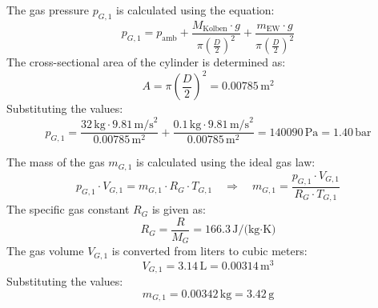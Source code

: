 The gas pressure \( p_{G,1} \) is calculated using the equation:  
\[
p_{G,1} = p_{\text{amb}} + \frac{M_{\text{Kolben}} \cdot g}{\pi \left(\frac{D}{2}\right)^2} + \frac{m_{\text{EW}} \cdot g}{\pi \left(\frac{D}{2}\right)^2}
\]  
The cross-sectional area of the cylinder is determined as:  
\[
A = \pi \left(\frac{D}{2}\right)^2 = 0.00785 \, \text{m}^2
\]  
Substituting the values:  
\[
p_{G,1} = \frac{32 \, \text{kg} \cdot 9.81 \, \text{m/s}^2}{0.00785 \, \text{m}^2} + \frac{0.1 \, \text{kg} \cdot 9.81 \, \text{m/s}^2}{0.00785 \, \text{m}^2} = 140090 \, \text{Pa} = 1.40 \, \text{bar}
\]  

The mass of the gas \( m_{G,1} \) is calculated using the ideal gas law:  
\[
p_{G,1} \cdot V_{G,1} = m_{G,1} \cdot R_G \cdot T_{G,1} \quad \Rightarrow \quad m_{G,1} = \frac{p_{G,1} \cdot V_{G,1}}{R_G \cdot T_{G,1}}
\]  
The specific gas constant \( R_G \) is given as:  
\[
R_G = \frac{R}{M_G} = 166.3 \, \text{J/(kg·K)}
\]  
The gas volume \( V_{G,1} \) is converted from liters to cubic meters:  
\[
V_{G,1} = 3.14 \, \text{L} = 0.00314 \, \text{m}^3
\]  
Substituting the values:  
\[
m_{G,1} = 0.00342 \, \text{kg} = 3.42 \, \text{g}
\]